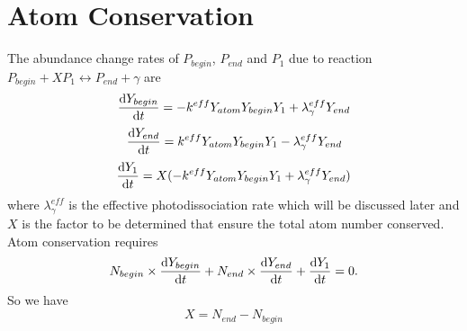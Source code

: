 \documentclass{article}
\begin{document}
\section{Atom Conservation}

The abundance change rates of $P_{begin}$, $P_{end}$ and $P_1$ due to 
reaction $P_{begin} + X P_1 \longleftrightarrow P_{end} + \gamma$ are
\[
\frac{{\rm d}Y_{begin}}{{\rm d}t} =
  -k^{eff} Y_{atom} Y_{begin} Y_1 + \lambda_\gamma^{eff} Y_{end}  
\]
\[
\frac{{\rm d}Y_{end}}{{\rm d}t} =
  k^{eff} Y_{atom} Y_{begin} Y_1 - \lambda_\gamma^{eff} Y_{end}  
\]
\[
\frac{{\rm d}Y_1}{{\rm d}t} =
  X( -k^{eff} Y_{atom} Y_{begin} Y_1 + \lambda_\gamma^{eff} Y_{end} )
\]
where $\lambda_\gamma^{eff}$ is the effective photodissociation rate which
will be discussed later and $X$ is the factor to be determined that ensure
the total atom number conserved. Atom conservation requires
\[
N_{begin} \times \frac{{\rm d}Y_{begin}}{{\rm d}t} +
N_{end} \times \frac{{\rm d}Y_{end}}{{\rm d}t} +
\frac{{\rm d}Y_1}{{\rm d}t} = 0.
\] 
So we have
\[
X = N_{end} - N_{begin}
\]
\end{document}

